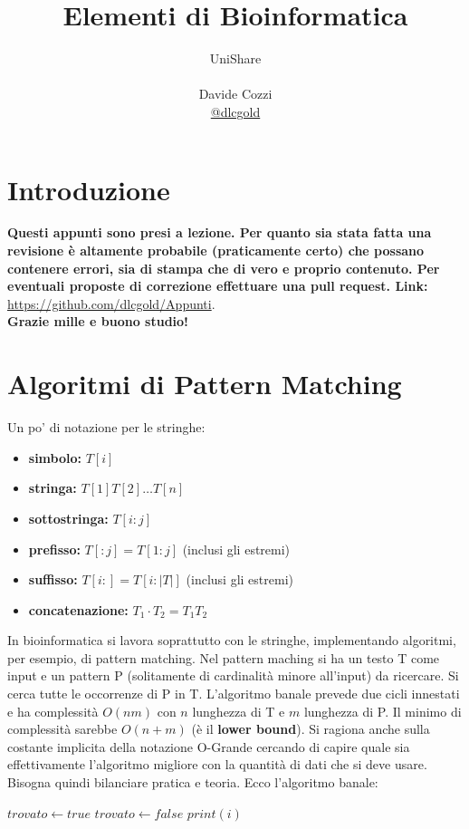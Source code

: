 \documentclass[a4paper,12pt, oneside]{book}
\title{Elementi di Bioinformatica}
\author{UniShare\\\\Davide Cozzi\\\href{https://t.me/dlcgold}{@dlcgold}}
\date{}
\begin{document}
\maketitle

\newtheorem{teorema}{Teorema}
\newtheorem{definizione}{Definizione}
\newtheorem{esempio}{Esempio}
\newtheorem{corollario}{Corollario}
\newtheorem{lemma}{Lemma}
\newtheorem{osservazione}{Osservazione}
\newtheorem{nota}{Nota}
\newtheorem{esercizio}{Esercizio}
\tableofcontents
\renewcommand{\chaptermark}[1]{%
  \markboth{\chaptername
    \ \thechapter.\ #1}{}}
\renewcommand{\sectionmark}[1]{\markright{\thesection.\ #1}}
\chapter{Introduzione}
\textbf{Questi appunti sono presi a lezione. Per quanto sia stata
  fatta una revisione è altamente probabile (praticamente certo) che
  possano contenere errori, sia di stampa che di vero e proprio
  contenuto. Per eventuali proposte di correzione effettuare
  una pull request. Link: }
\url{https://github.com/dlcgold/Appunti}.\\
\textbf{Grazie mille e buono studio!}
\chapter{Algoritmi di Pattern Matching}
Un po' di notazione per le stringhe:
\begin{itemize}
  \item \textbf{simbolo:} $T[i]$
  \item \textbf{stringa:} $T[1]T[2]\ldots T[n]$
  \item \textbf{sottostringa:} $T[i:j]$
  \item \textbf{prefisso:} $T[:j] = T[1:j]$ (inclusi gli estremi)
  \item \textbf{suffisso:} $T[i:] = T[i:|T|]$ (inclusi gli estremi)
  \item \textbf{concatenazione:} $T_1\cdot T_2 = T_1T_2$
\end{itemize}
In bioinformatica si lavora soprattutto con le stringhe, implementando
algoritmi, per esempio, di pattern matching. Nel pattern maching si ha
un testo T come input e un pattern P (solitamente di cardinalità minore
all'input) da ricercare. Si cerca tutte le occorrenze di P in
T. L'algoritmo banale prevede due cicli innestati e ha complessità
$O(nm)$ con $n$ lunghezza di T e $m$ lunghezza di P. Il minimo di
complessità sarebbe $O(n+m)$ (è il \textbf{lower bound}). Si ragiona
anche sulla costante implicita della notazione O-Grande cercando di
capire quale sia effettivamente l'algoritmo migliore con la quantità
di dati che si deve usare. Bisogna quindi bilanciare pratica e teoria.
\newpage
Ecco l'algoritmo banale:
\begin{shaded}
  \begin{algorithmic}
    \State $trovato \gets true$
    \State $trovato \gets false$
    \EndIf
    \EndFor
    \State $print(i)$
    \EndIf
    \EndFor
  \end{algorithmic} 
\end{shaded}
\end{document}
